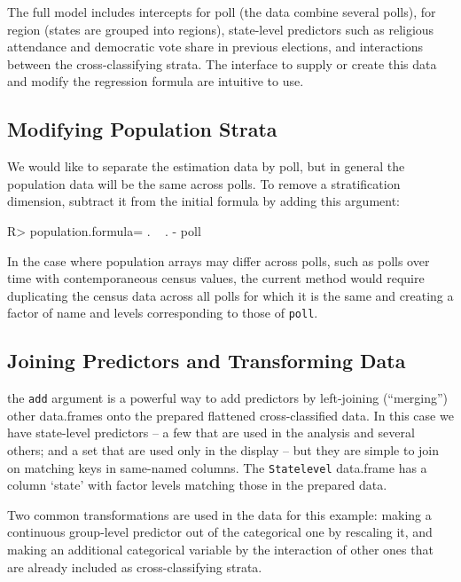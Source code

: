 \documentclass[11pt]{article} %
\begin{document}
The full model includes intercepts for poll (the data combine several polls), for region (states are grouped into regions), state-level predictors such as religious attendance and democratic vote share in previous elections, and interactions between the cross-classifying strata. The interface to supply or create this data and modify the regression formula are intuitive to use.

\subsection{Modifying Population Strata}
\label{sec:modify-popul-strata}

We would like to separate the estimation data by poll, but in general the population data will be the same across polls. To remove a stratification dimension, subtract it from the initial formula by adding this argument:
\begin{Schunk}
\begin{Sinput}
R> population.formula= . ~ . - poll
\end{Sinput}
\end{Schunk}

In the case where population arrays may differ across polls, such as polls over time with contemporaneous census values, the current method would require duplicating the census data across all polls for which it is the same and creating a factor of name and levels corresponding to those of \texttt{poll}.

\subsection{Joining Predictors and Transforming Data}
\label{sec:join-pred-transf}

the \texttt{add} argument is a powerful way to add predictors by left-joining (“merging”) other data.frames onto the prepared flattened cross-classified data. In this case we have state-level predictors -- a few that are used in the analysis and several others; and a set that are used only in the display -- but they are simple to join on matching keys in same-named columns. The \texttt{Statelevel} data.frame has a column `state' with factor levels matching those in the prepared data. 

Two common transformations are used in the data for this example: making a continuous group-level predictor out of the categorical one by rescaling it, and making an additional categorical variable by the interaction of other ones that are already included as cross-classifying strata.
\end{document}

